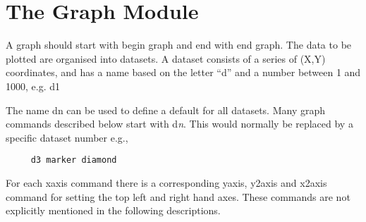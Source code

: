 \chapter{The Graph Module}
\label{graph:chap}
A graph should start with {\sf begin graph} and end with {\sf end graph}.
The data to be plotted are organised into datasets.  A dataset consists of a
series of (X,Y) coordinates, and has a name based on the letter ``d'' and a
number between 1 and 1000, e.g. {\sf d1}

The name {\sf dn} can be used to define a default for
all datasets.  Many graph commands described below start with {\sf d}{\it n}.
This would normally be replaced by a specific dataset number e.g.,

\preglecode{}
\begin{Verbatim}
     d3 marker diamond
\end{Verbatim}
\postglecode{}

For each {\sf xaxis} command there is a corresponding {\sf yaxis, y2axis
and x2axis} command for setting the top left and right hand axes.  These
commands are not explicitly mentioned in the following descriptions.

